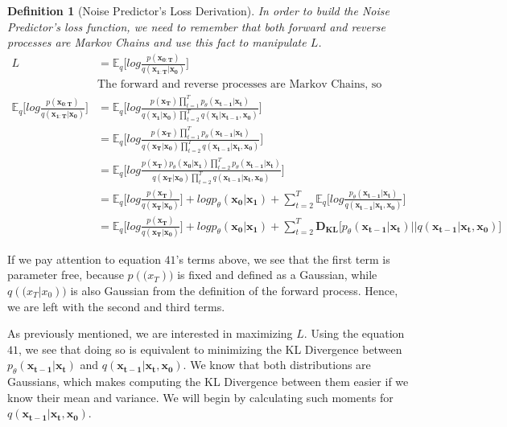 \documentclass{article}
\newtheorem{definition}{Definition}[section]
\begin{document}
\begin{definition}[Noise Predictor's Loss Derivation]
	In order to build the Noise Predictor's loss function, we need to remember that both forward and reverse processes are Markov Chains and use this fact to manipulate $L$.
	\begin{align}
		L & =   \mathbb{E}_q\bigg[log \frac{p(\mathbf{x_{0:T}})} {q(\mathbf{x_{1:T}| x_0})}\bigg] \\
		& \text{The forward and reverse processes are Markov Chains, so} \\
		 \mathbb{E}_q\bigg[ log \frac{p(\mathbf{x_{0:T}})} {q(\mathbf{x_{1:T}| x_0})} \bigg] &=  \mathbb{E}_q\bigg[ log \frac{p(\mathbf{x_{T}}) \prod_{t=1}^T p_\theta(\mathbf{x_{t-1} | x_t})} {q(\mathbf{x_1| x_0}) \prod_{t=2}^T q(\mathbf{x_{t} | x_{t-1}, x_0})} \bigg] \\
		&=  \mathbb{E}_q\bigg[ log \frac{p(\mathbf{x_{T}}) \prod_{t=1}^T p_\theta(\mathbf{x_{t-1} | x_t})} {q(\mathbf{x_T| x_0}) \prod_{t=2}^T q(\mathbf{x_{t-1} | x_t, x_0})} \bigg] \\
		&=  \mathbb{E}_q\bigg[ log \frac{p(\mathbf{x_{T}}) p_\theta(\mathbf{x_0 | x_1})\prod_{t=2}^T p_\theta(\mathbf{x_{t-1} | x_t})} {q(\mathbf{x_T| x_0}) \prod_{t=2}^T q(\mathbf{x_{t-1} | x_t, x_0})} \bigg] \\
		&=  \mathbb{E}_q\bigg[ log \frac{p(\mathbf{x_{T}})}{q(\mathbf{x_T| x_0})} \bigg] + log p_\theta(\mathbf{x_0 | x_1}) +  \sum_{t=2}^T  \mathbb{E}_q\bigg[ log  \frac{p_\theta(\mathbf{x_{t-1} | x_t})} {q(\mathbf{x_{t-1} | x_t, x_0})} \bigg] \\
		&=  \mathbb{E}_q\bigg[ log \frac{p(\mathbf{x_{T}})}{q(\mathbf{x_T| x_0})} \bigg] + log p_\theta(\mathbf{x_0 | x_1}) + \sum_{t=2}^T 	\mathbf{D_{KL}}\big[ p_\theta (\mathbf{x_{t-1} | x_t})  || q(\mathbf{x_{t-1} | x_t,  x_0}) \big]
	\end{align}
\end{definition}

If we pay attention to equation $41$'s terms above, we see that the first term is parameter free, because $p(\mathbf(x_T))$ is fixed and defined as a Gaussian, while $q(\mathbf(x_T | x_0))$ is also Gaussian from the definition of the forward process. Hence, we are left with the second and third terms. 

As previously mentioned, we are interested in maximizing $L$. Using the equation $41$, we see that doing so is equivalent to minimizing the KL Divergence between $p_\theta (\mathbf{x_{t-1} | x_t})$ and $q(\mathbf{x_{t-1} | x_t,  x_0})$. We know that both distributions are Gaussians, which makes computing the KL Divergence between them easier if we know their mean and variance. We will begin by calculating such moments for $q(\mathbf{x_{t-1} | x_t,  x_0})$.
	
\end{document}
